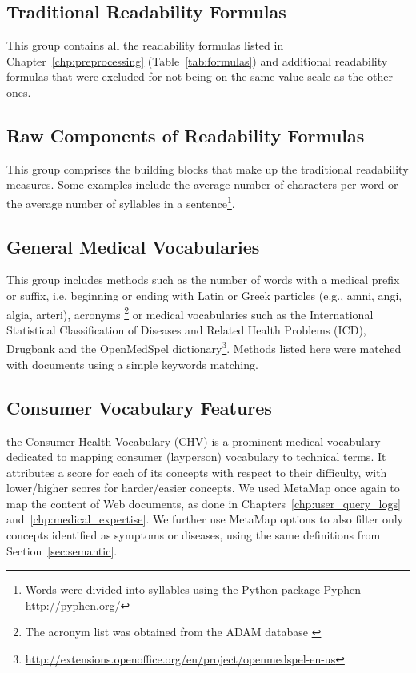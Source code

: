 \documentclass[runningheads,a4paper]{llncs}
\begin{document}

\subsection{Traditional Readability Formulas}
This group contains all the readability formulas listed in Chapter~\ref{chp:preprocessing} (Table~\ref{tab:formulas}) and additional readability formulas that were excluded for not being on the same value scale as the other ones.

\subsection{Raw Components of Readability Formulas}
This group comprises the building blocks that make up the traditional readability measures. Some examples include the average number of characters per word or the average number of syllables in a sentence\footnote{Words were divided into syllables using the Python package Pyphen \url{http://pyphen.org/}}.

\subsection{General Medical Vocabularies}
This group includes methods such as the number of words with a medical prefix or suffix, i.e. beginning or ending with Latin or Greek particles (e.g., amni, angi, algia, arteri), acronyms \footnote{The acronym list was obtained from the ADAM database \cite{zhou2006}} or medical vocabularies such as the International Statistical Classification of Diseases and Related Health Problems (ICD), Drugbank and the OpenMedSpel dictionary\footnote{\url{http://extensions.openoffice.org/en/project/openmedspel-en-us}}. 
Methods listed here were matched with documents using a simple keywords matching.

\subsection{Consumer Vocabulary Features}
the Consumer Health Vocabulary (CHV) is a prominent medical vocabulary dedicated to mapping consumer (layperson) vocabulary to technical terms. 
It attributes a score for each of its concepts with respect to their difficulty, with lower/higher scores for harder/easier concepts.
We used MetaMap once again to map the content of Web documents, as done in Chapters~\ref{chp:user_query_logs} and~\ref{chp:medical_expertise}. 
We further use MetaMap options to also filter only concepts identified as symptoms or diseases, using the same definitions from Section~\ref{sec:semantic}. 
\end{document}
